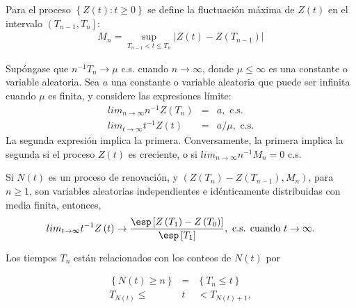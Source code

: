 \begin{Def}
Para el proceso $\left\{Z\left(t\right):t\geq0\right\}$ se define la fluctuaci\'on m\'axima de $Z\left(t\right)$ en el intervalo $\left(T_{n-1},T_{n}\right]$:
\begin{eqnarray*}
M_{n}=\sup_{T_{n-1}<t\leq T_{n}}|Z\left(t\right)-Z\left(T_{n-1}\right)|
\end{eqnarray*}
\end{Def}

\begin{Teo}
Sup\'ongase que $n^{-1}T_{n}\rightarrow\mu$ c.s. cuando $n\rightarrow\infty$, donde $\mu\leq\infty$ es una constante o variable aleatoria. Sea $a$ una constante o variable aleatoria que puede ser infinita cuando $\mu$ es finita, y considere las expresiones l\'imite:
\begin{eqnarray}
lim_{n\rightarrow\infty}n^{-1}Z\left(T_{n}\right)&=&a,\textrm{ c.s.}\\
lim_{t\rightarrow\infty}t^{-1}Z\left(t\right)&=&a/\mu,\textrm{ c.s.}
\end{eqnarray}
La segunda expresi\'on implica la primera. Conversamente, la primera implica la segunda si el proceso $Z\left(t\right)$ es creciente, o si $lim_{n\rightarrow\infty}n^{-1}M_{n}=0$ c.s.
\end{Teo}

\begin{Coro}
Si $N\left(t\right)$ es un proceso de renovaci\'on, y $\left(Z\left(T_{n}\right)-Z\left(T_{n-1}\right),M_{n}\right)$, para $n\geq1$, son variables aleatorias independientes e id\'enticamente distribuidas con media finita, entonces,
\begin{eqnarray}
lim_{t\rightarrow\infty}t^{-1}Z\left(t\right)\rightarrow\frac{\esp\left[Z\left(T_{1}\right)-Z\left(T_{0}\right)\right]}{\esp\left[T_{1}\right]},\textrm{ c.s. cuando  }t\rightarrow\infty.
\end{eqnarray}
\end{Coro}
%
%

Los tiempos $T_{n}$ est\'an relacionados con los conteos de $N\left(t\right)$ por

\begin{eqnarray*}
\left\{N\left(t\right)\geq n\right\}&=&\left\{T_{n}\leq t\right\}\\
T_{N\left(t\right)}\leq &t&<T_{N\left(t\right)+1},
\end{eqnarray*}

